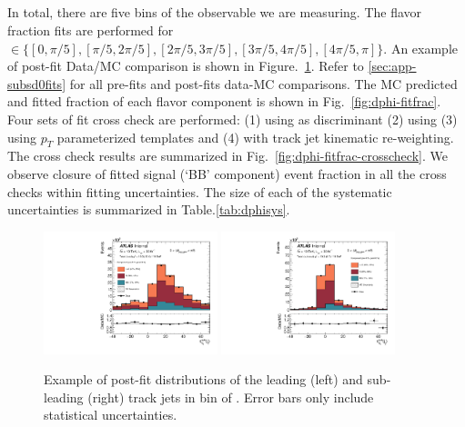 \clearpage
\subsection{\dphi}

In total, there are five bins of the \dphi observable we are measuring. The flavor fraction fits are performed for \dphi $\in\{[0, \pi/5], [\pi/5, 2\pi/5], [2\pi/5, 3\pi/5], [3\pi/5, 4\pi/5], [4\pi/5, \pi]\}$. An example of post-fit Data/MC comparison is shown in Figure.~\ref{fig:dphi-fit-example}. Refer to \ref{sec:app-subsd0fits} for all pre-fits and post-fits data-MC comparisons. The MC predicted and fitted fraction of each flavor component is shown in Fig.~\ref{fig:dphi-fitfrac}. Four sets of fit cross check are performed: (1) using \sdzero as discriminant (2) using \subsubsdzero (3) using $p_T$ parameterized templates and (4) with track jet kinematic re-weighting. The cross check results are summarized in Fig.~\ref{fig:dphi-fitfrac-crosscheck}. We observe closure of fitted signal (`BB' component) event fraction in all the cross checks within fitting uncertainties. The size of each of the systematic uncertainties is summarized in Table.\ref{tab:dphisys}.


\begin{figure}[htbp]
  \centering
 \includegraphics[width=0.45\textwidth]{figures/gbb/paperplots/Canv_Fit_dphi_LpT_INF_SpT_INF_coarse_x}
 \includegraphics[width=0.45\textwidth]{figures/gbb/paperplots/Canv_Fit_b0_25_dphi_0_3_LpT_INF_SpT_INF_coarse_y}
 \caption{Example of post-fit \subsdzero distributions of the leading (left) and sub-leading (right) track jets in bin of \dphi. Error bars only include statistical uncertainties.}
  \label{fig:dphi-fit-example}
\end{figure}


